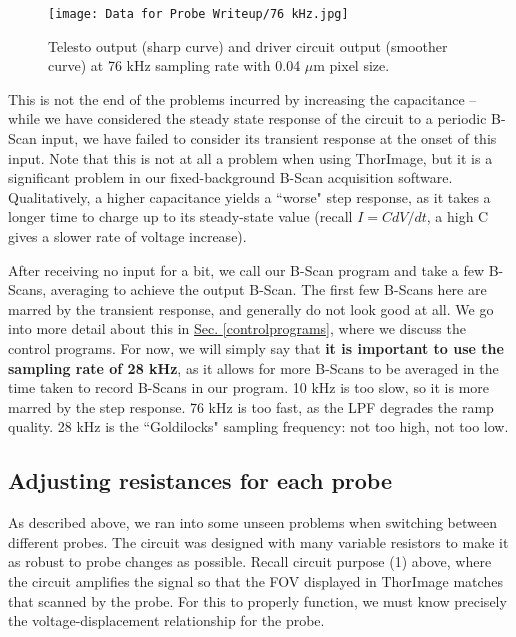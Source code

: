 \documentclass{article}
\begin{document}
\begin{figure}[!h]
	\centering
	\texttt{[image: Data for Probe Writeup/76 kHz.jpg]}
	\caption{Telesto output (sharp curve) and driver circuit output (smoother curve) at 76 kHz sampling rate with 0.04 $\mu$m pixel size.}\label{76khz}
\end{figure}

\par{This is not the end of the problems incurred by increasing the capacitance -- while we have considered the steady state response of the circuit to a periodic B-Scan input, we have failed to consider its transient response at the onset of this input. Note that this is not at all a problem when using ThorImage, but it is a significant problem in our fixed-background B-Scan acquisition software. Qualitatively, a higher capacitance yields a ``worse" step response, as it takes a longer time to charge up to its steady-state value (recall $I=C dV/dt$, a high C gives a slower rate of voltage increase).}

\par{After receiving no input for a bit, we call our B-Scan program and take a few B-Scans, averaging to achieve the output B-Scan. The first few B-Scans here are marred by the transient response, and generally do not look good at all. We go into more detail about this in \hyperlink{controlprograms}{Sec. \ref{controlprograms}}, where we discuss the control programs. For now, we will simply say that \textbf{it is important to use the sampling rate of 28 kHz}, as it allows for more B-Scans to be averaged in the time taken to record B-Scans in our program. 10 kHz is too slow, so it is more marred by the step response. 76 kHz is too fast, as the LPF degrades the ramp quality. 28 kHz is the ``Goldilocks" sampling frequency: not too high, not too low.}


\subsection{Adjusting resistances for each probe}

\par{As described above, we ran into some unseen problems when switching between different probes. The circuit was designed with many variable resistors to make it as robust to probe changes as possible. Recall circuit purpose (1) above, where the circuit amplifies the signal so that the FOV displayed in ThorImage matches that scanned by the probe. For this to properly function, we must know precisely the voltage-displacement relationship for the probe.}
\end{document}
